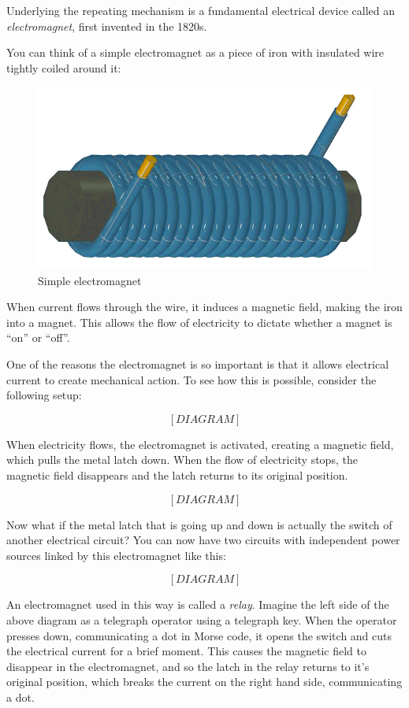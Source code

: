 \documentclass[UTF8]{book}
\begin{document}
\begin{CJK}{UTF8}{gbsn}
Underlying the repeating mechanism is a fundamental electrical device called an \emph{electromagnet}, first invented in the 1820s.

You can think of a simple electromagnet as a piece of iron with insulated wire tightly coiled around it:

\begin{figure}[H]
\centering
\includegraphics[width=0.8\linewidth]{electromagnet}
\caption{Simple electromagnet}
\end{figure}

When current flows through the wire, it induces a magnetic field, making the iron into a magnet. This allows the flow of electricity to dictate whether a magnet is ``on'' or ``off''.

One of the reasons the electromagnet is so important is that it allows electrical current to create mechanical action. To see how this is possible, consider the following setup:

\[ [DIAGRAM] \]

When electricity flows, the electromagnet is activated, creating a magnetic field, which pulls the metal latch down. When the flow of electricity stops, the magnetic field disappears and the latch returns to its original position.

\[ [DIAGRAM] \]

Now what if the metal latch that is going up and down is actually the switch of another electrical circuit? You can now have two circuits with independent power sources linked by this electromagnet like this:

\[ [DIAGRAM] \]

An electromagnet used in this way is called a \emph{relay}. Imagine the left side of the above diagram as a telegraph operator using a telegraph key. When the operator presses down, communicating a dot in Morse code, it opens the switch and cuts the electrical current for a brief moment. This causes the magnetic field to disappear in the electromagnet, and so the latch in the relay returns to it's original position, which breaks the current on the right hand side, communicating a dot.


\end{CJK}
\end{document}
